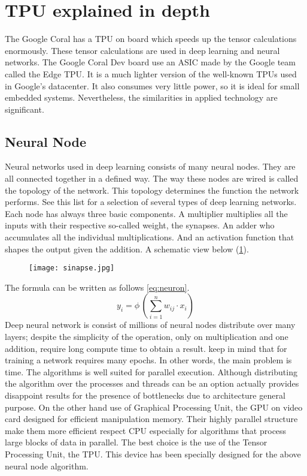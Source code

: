 \section{TPU explained in depth}
\label{sec:hard-tpu}
The Google Coral has a TPU on board which speeds up the tensor calculations
enormously. These tensor calculations are used in deep learning and neural
networks. \hfill \break 
The Google Coral Dev board use an ASIC made by the Google team called the Edge 
TPU. It is a much lighter version of the well-known TPUs used in Google's 
datacenter. \hfill \break
It also consumes very little power, so it is ideal for small embedded systems. 
Nevertheless, the similarities in applied technology are significant.\cite{TPU:explained} 
%
\subsection{Neural Node}
\label{ssec:hard-neural-node}
Neural networks used in deep learning consists of many neural nodes. They are
all connected together in a defined way. The way these nodes are wired is
called the topology of the network. This topology determines the function the
network performs. See this list for a selection of several types of deep
learning networks. Each node has always three basic components. 
A multiplier multiplies all the inputs with their respective so-called weight,
the synapses. An adder who accumulates all the individual multiplications. 
And an activation function that shapes the output given the addition. A
schematic view below (\ref{fig:neuron}).\hfill \break
%
\begin{figure}[htb]
	\centering
	\texttt{[image: sinapse.jpg]}
	\label{fig:neuron}
\end{figure}
%
\newpage
\noindent The formula can be written as follows \eqref{eq:neuron}.
\begin{equation}
\label{eq:neuron}
	y_{i} = \phi \, \left(\sum_{i=1}^{n} w_{ij}\cdot x_{i} \right)
\end{equation}
%
Deep neural network is consist of millions of neural nodes distribute over many
layers; despite the simplicity of the operation, only on multiplication and one
addition, require long compute time to obtain a result. keep in mind that for
training a network requires many epochs. In other words, the main problem is
time. The algorithms is well suited for parallel execution. Although
distributing the algorithm over the processes and threads can be an option
actually provides disappoint results for the presence of bottlenecks due to
architecture general purpose. On the other hand use of Graphical Processing
Unit, the GPU on video card designed for efficient manipulation memory. Their
highly parallel structure make them more efficient respect CPU especially for
algorithms that process large blocks of data in parallel. The best choice is the
use of the Tensor Processing Unit, the TPU. This device has been specially
designed for the above neural node algorithm.
%
